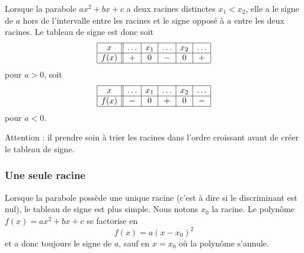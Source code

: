 \begin{Aretenir}
    Lorsque la parabole \( ax^2+bx+c\) a deux racines distinctes \( x_1<x_2\), elle a le signe de \( a\) hors de l'intervalle entre les racines et le signe opposé à \( a\) entre les deux racines. Le tableau de signe est donc soit
            \begin{equation}
                \begin{array}[h]{|c||c|c|c|c|c|}
                    \hline
                    x&\ldots&x_1&\ldots&x_2&\ldots\\
                    \hline
                    f(x)&+&0&-&0&+\\
                    \hline
                \end{array}
            \end{equation}
            pour \( a>0\), soit
            \begin{equation}
                \begin{array}[h]{|c||c|c|c|c|c|}
                    \hline
                    x&\ldots&x_1&\ldots&x_2&\ldots\\
                    \hline
                    f(x)&-&0&+&0&-\\
                    \hline
                \end{array}
            \end{equation}
            pour \( a<0\).

            Attention : il prendre soin à trier les racines dans l'ordre croissant avant de créer le tableau de signe.
\end{Aretenir}

\subsubsection{Une seule racine}

Lorsque la parabole possède une unique racine (c'est à dire si le discriminant est nul), le tableau de signe est plus simple. Nous notons \( x_0\) la racine. Le polynôme \( f(x)=ax^2+bx+c\) se factorise en
\begin{equation}
    f(x)=a(x-x_0)^2
\end{equation}
et a donc toujours le signe de \( a\), sauf en \( x=x_0\) où la polynôme s'annule.


